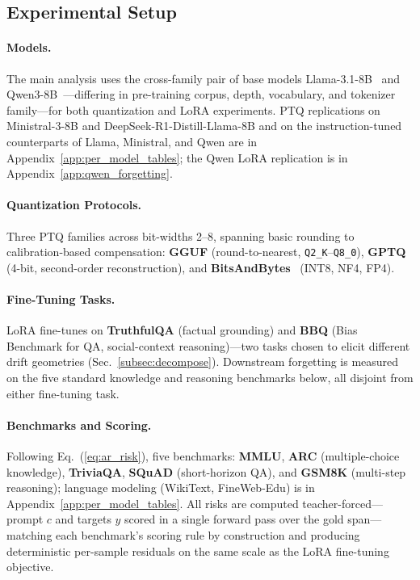 \documentclass{article}
\begin{document}
\subsection{Experimental Setup}
\label{subsec:exp_setup}

\paragraph{Models.}
The main analysis uses the cross-family pair of base models Llama-3.1-8B~\cite{grattafiori2024llama} and Qwen3-8B~\cite{qwen2025qwen3}---differing in pre-training corpus, depth, vocabulary, and tokenizer family---for both quantization and LoRA experiments. PTQ replications on Ministral-3-8B and DeepSeek-R1-Distill-Llama-8B and on the instruction-tuned counterparts of Llama, Ministral, and Qwen are in Appendix~\ref{app:per_model_tables}; the Qwen LoRA replication is in Appendix~\ref{app:qwen_forgetting}.

\paragraph{Quantization Protocols.}
Three PTQ families across bit-widths 2--8, spanning basic rounding to calibration-based compensation: \textbf{GGUF} (round-to-nearest, \texttt{Q2\_K}--\texttt{Q8\_0}), \textbf{GPTQ}~\cite{frantar2022gptq} (4-bit, second-order reconstruction), and \textbf{BitsAndBytes}~\cite{dettmers2022gpt3} (INT8, NF4, FP4).

\paragraph{Fine-Tuning Tasks.}
LoRA fine-tunes on \textbf{TruthfulQA} (factual grounding) and \textbf{BBQ} (Bias Benchmark for QA, social-context reasoning)---two tasks chosen to elicit different drift geometries (Sec.~\ref{subsec:decompose}). Downstream forgetting is measured on the five standard knowledge and reasoning benchmarks below, all disjoint from either fine-tuning task.

\paragraph{Benchmarks and Scoring.}
Following Eq.~(\ref{eq:ar_risk}), five benchmarks: \textbf{MMLU}, \textbf{ARC} (multiple-choice knowledge), \textbf{TriviaQA}, \textbf{SQuAD} (short-horizon QA), and \textbf{GSM8K} (multi-step reasoning); language modeling (WikiText, FineWeb-Edu) is in Appendix~\ref{app:per_model_tables}. All risks are computed teacher-forced---prompt $c$ and targets $y$ scored in a single forward pass over the gold span---matching each benchmark's scoring rule by construction and producing deterministic per-sample residuals on the same scale as the LoRA fine-tuning objective.
\end{document}
